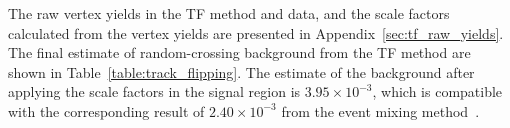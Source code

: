 The raw vertex yields in the TF method and data, and the scale factors calculated from the vertex yields are presented in Appendix~\ref{sec:tf_raw_yields}. The final estimate of random-crossing background from the TF method are shown in Table~\ref{table:track_flipping}. The estimate of the background after applying the scale factors in the signal region is $3.95\times10^{-3}$, which is compatible with the corresponding result of $2.40\times 10^{-3}$ from the event mixing method~\cite{DuarteCampderros:2275055}.


\begin{table}[!htb]%
  \centering
  \caption{The estimate of random-crossing background in the signal region. Scale factors (Table~\ref{table:tf_raw_yields}) are applied to obtain the corrected estimate of the background.}%
  \label{table:track_flipping}
\end{table}





